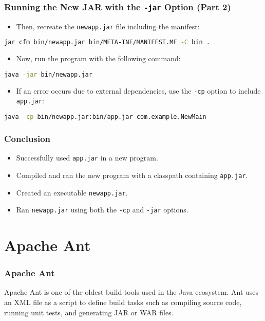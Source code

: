 \documentclass[aspectratio=169, table]{beamer}
\begin{document}
\begin{frame}[fragile]
	\frametitle{\LARGE{Running the New JAR with the \texttt{-jar} Option (Part 2)}}
	\begin{itemize}
		\item Then, recreate the \texttt{newapp.jar} file including the manifest:
	\end{itemize}
	\begin{lstlisting}[language=bash]
		jar cfm bin/newapp.jar bin/META-INF/MANIFEST.MF -C bin .
	\end{lstlisting}
	\begin{itemize}
		\item Now, run the program with the following command:
	\end{itemize}
	\begin{lstlisting}[language=bash]
		java -jar bin/newapp.jar
	\end{lstlisting}
	\begin{itemize}
		\item If an error occurs due to external dependencies, use the \texttt{-cp} option to include \texttt{app.jar}:
	\end{itemize}
	\begin{lstlisting}[language=bash]
		java -cp bin/newapp.jar:bin/app.jar com.example.NewMain
	\end{lstlisting}
\end{frame}


\begin{frame}
	\frametitle{Conclusion}
	\begin{itemize}
		\item Successfully used \texttt{app.jar} in a new program.
		\item Compiled and ran the new program with a classpath containing \texttt{app.jar}.
		\item Created an executable \texttt{newapp.jar}.
		\item Ran \texttt{newapp.jar} using both the \texttt{-cp} and \texttt{-jar} options.
	\end{itemize}
\end{frame}


\section{Apache Ant}

\begin{frame}
	\frametitle{Apache Ant}
	Apache Ant is one of the oldest build tools used in the Java ecosystem. Ant uses an XML file as a script to define build tasks such as compiling source code, running unit tests, and generating JAR or WAR files.
\end{frame}
\end{document}
